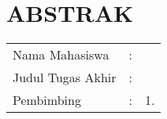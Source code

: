 \chapter*{ABSTRAK}

\vspace{2ex}

\begingroup
\setlength{\tabcolsep}{0pt}

\noindent
\begin{tabularx}{\textwidth}{l >{\centering}m{2em} X}
  Nama Mahasiswa    & : & \name{}         \\

  Judul Tugas Akhir & : & \tatitle{}      \\

  Pembimbing        & : & 1. \advisor{}   \\
\end{tabularx}
\endgroup



